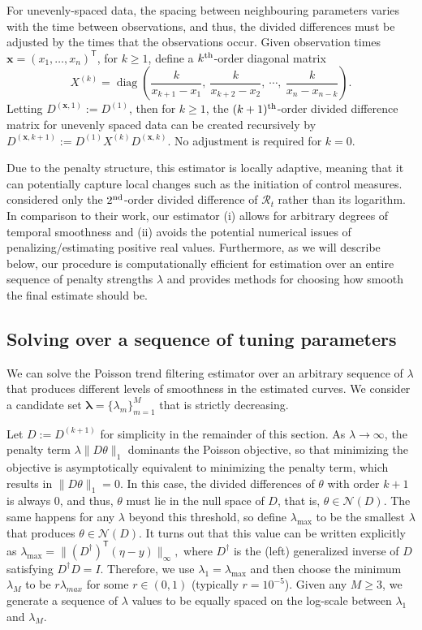 \documentclass[10pt,letterpaper]{article}
\newcommand{\lr}[1]{\left(#1\right)}
\newcommand{\snorm}[1]{\lVert #1 \rVert}
\DeclareMathOperator*{\diag}{diag}
\def\bfx{\mathbf{x}}
\def\calR{\mathcal{R}}
\renewcommand{\top}{\mathsf{T}}
\def\th{^{\textnormal{th}}}
\def\second{$2^{\textnormal{nd}}$}
\begin{document}
For unevenly-spaced data, the spacing between neighbouring parameters
varies with the time between observations, and thus, the divided differences
must be adjusted by the times that the observations occur. Given observation
times $\bfx = {(x_1,\dots,x_n)}^\top$, for $k \geq 1$, define a $k\th$-order
diagonal matrix $$X^{(k)} = \diag \lr{\frac{k}{x_{k+1} - x_1},\ \frac{k}{x_{k+2}
- x_2},\ \cdots,\ \frac{k}{x_n - x_{n-k}} }.$$ Letting $D^{(\bfx,1)} := D^{(1)}$,
then for $k\geq 1$, the $(k+1)\th$-order divided difference matrix for unevenly
spaced data can be created recursively by
$D^{(\bfx, k+1)} := D^{(1)} X^{(k)} D^{(\bfx,k)}.$ No adjustment is required
for $k=0$. 


Due to the penalty structure, this estimator is locally adaptive,
meaning that it can potentially capture local changes such as the initiation of
control measures. \cite{abry2020spatial,pascal2022nonsmooth} considered only the
\second-order divided difference of $\calR_t$ rather than its logarithm. In
comparison to their work, our estimator (i) allows for arbitrary degrees of
temporal smoothness and (ii) avoids the potential numerical issues of
penalizing/estimating positive real values. Furthermore, as we will describe
below, our procedure is computationally efficient for estimation over an entire
sequence of penalty strengths $\lambda$ and provides methods for choosing how
smooth the final estimate should be.


\subsection{Solving over a sequence of tuning parameters}
\label{sec:candidate-set}

We can solve the Poisson trend filtering estimator over an arbitrary sequence of 
$\lambda$ that produces different levels of smoothness in the estimated curves. 
We consider a candidate set $\boldsymbol{\lambda} = \{\lambda_m\}_{m=1}^M$
that is strictly decreasing.


Let $D := D^{(k+1)}$ for simplicity in the remainder of this section. As
$\lambda \to\infty$, the penalty term $\lambda \snorm{D\theta}_1$ dominants the
Poisson objective, so that minimizing the objective is asymptotically equivalent
to minimizing the penalty term, which results in $\snorm{D\theta}_1 = 0$. In
this case, the divided differences of $\theta$ with order $k+1$ is always $0$,
and thus, $\theta$ must lie in the null space of $D$, that is,
$\theta\in\mathcal{N}(D)$. The same happens for any $\lambda$ beyond this
threshold, so define $\lambda_{\textrm{max}}$ to be the smallest $\lambda$ that
produces $\theta\in\mathcal{N}(D)$. It turns out that this value can be written
explicitly as $\lambda_{\textrm{max}} = \snorm{\lr{D^{\dagger}}^{\top} \lr{\eta
- y}}_{\infty},$ where $D^{\dagger}$ is the (left) generalized inverse of $D$
satisfying $D^{\dagger} D = I$. Therefore, we use $\lambda_1 =
\lambda_{\textrm{max}}$ and then choose the minimum $\lambda_M$ to be
$r\lambda_{max}$ for some $r \in (0,1)$ (typically $r=10^{-5}$). Given any
$M\geq 3$, we generate a sequence of $\lambda$ values to be equally spaced on
the log-scale between $\lambda_1$ and $\lambda_M$. 
\end{document}
